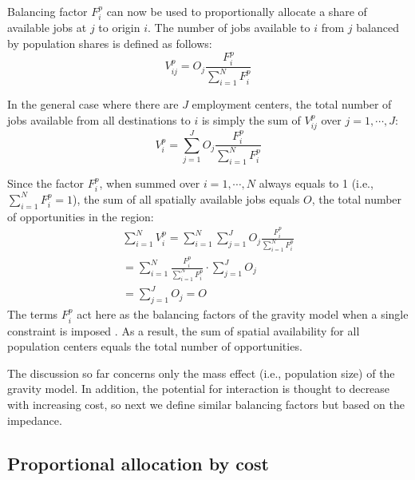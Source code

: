 \documentclass[]{elsarticle} %
\begin{document}
Balancing factor \(F^p_{i}\) can now be used to proportionally allocate
a share of available jobs at \(j\) to origin \(i\). The number of jobs
available to \(i\) from \(j\) balanced by population shares is defined
as follows: \[
V^p_{ij} = O_j\frac{F^p_{i}}{\sum_{i=1}^N F^p_{i}}
\]

In the general case where there are \(J\) employment centers, the total
number of jobs available from all destinations to \(i\) is simply the
sum of \(V^p_{ij}\) over \(j=1,\cdots, J\): \[
V^p_{i} = \sum_{j=1}^J O_j\frac{F^p_{i}}{\sum_{i=1}^N F^p_{i}}
\]

Since the factor \(F^p_{i}\), when summed over \(i=1,\cdots,N\) always
equals to 1 (i.e., \(\sum_{i=1}^{N} F^p_{i} = 1\)), the sum of all
spatially available jobs equals \(O\), the total number of opportunities
in the region: \[
\begin{array}{l}
\sum_{i=1}^N V^p_i =\sum_{i=1}^N\sum_{j=1}^JO_j\frac{F^p_{i}}{\sum_{i=1}^N F^p_{i}}\\
=\sum_{i=1}^N \frac{F^p_{i}}{\sum_{i=1}^N F^p_{i}}\cdot\sum_{j=1}^JO_j\\
=\sum_{j=1}^J O_j = O
\end{array}
\] The terms \(F^p_{i}\) act here as the balancing factors of the
gravity model when a single constraint is imposed \citep[i.e., to ensure
that the sums of columns are equal to the number of opportunities per
destination, see][pp.~179-180 and 183-184]{ortuzar_2011_modelling}. As a
result, the sum of spatial availability for all population centers
equals the total number of opportunities.

The discussion so far concerns only the mass effect (i.e., population
size) of the gravity model. In addition, the potential for interaction
is thought to decrease with increasing cost, so next we define similar
balancing factors but based on the impedance.

\hypertarget{proportional-allocation-by-cost}{%
\subsection{Proportional allocation by
cost}\label{proportional-allocation-by-cost}}
\end{document}
